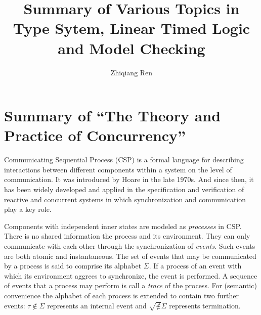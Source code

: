 \documentclass{llncs}
\date{}
\newcommand{\csptick}{\surd}
\newcommand{\csptau}{\tau}
\begin{document}
\title{%
Summary of Various Topics in \break
Type Sytem, Linear Timed Logic and Model Checking
} %
\author{Zhiqiang Ren}

\maketitle %

% 
% 


\setcounter{page}{1}

\baselineskip=11.875pt

\newpage
\section{Summary of ``The Theory and Practice of 
  Concurrency''\cite{Roscoe1997Theory}} 
  \label{section:CSP}

Communicating Sequential Process (CSP) is a formal language for describing
interactions between different components within a system on the level of
communication. It was introduced by Hoare in the late 1970s. And since then,
it has been widely developed and applied in the specification and verification
of reactive and concurrent systems in which synchronization and communication
play a key role.

Components with independent inner states are modeled as \emph{processes} in
CSP. There is no shared information the process and its environment. They
can only communicate with each other through the synchronization of
\emph{events}. Such events are both atomic and instantaneous. The set
of events that may be communicated by a process is said to comprise its
alphabet $\Sigma$. If a process of an event with which its environment
aggrees to synchronize, the event is performed. A sequence of events that
a process may perform is call a \emph{trace} of the process. For (semantic)
convenience the alphabet of each process is extended to contain two further
events: $\csptau \notin \Sigma$ represents an internal event and $\csptick \notin
\Sigma$ represents termination.
\end{document}
